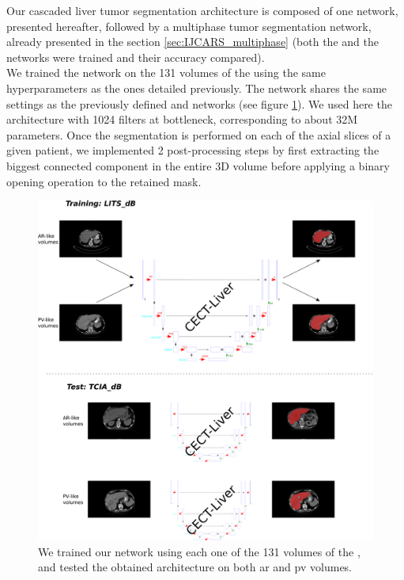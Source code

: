 Our cascaded liver tumor segmentation architecture is composed of one  network, presented hereafter, followed by a multiphase tumor segmentation network, already presented in the section \ref{sec:IJCARS_multiphase} (both the  and the  networks were trained and their accuracy compared). \\
We trained the  network on the 131 volumes of the
\textbf{} using the same hyperparameters as the ones detailed
previously. The network shares the same settings as the previously defined  and  networks (see figure \ref{fig:CECTliverDetails}). We used here the architecture with 1024 filters at bottleneck, corresponding to about 32M parameters. Once the segmentation is performed on each of the axial slices of a given patient, we implemented 2 post-processing steps by first extracting the biggest connected component in the entire 3D volume before applying a binary opening operation to the retained mask.
\begin{figure}[!ht]
	\centering
	\includegraphics[width=\linewidth]{../Contributions/images/CECT_liver_details}
	\caption{We trained our network using each one of the 131 volumes of the \textbf{}, and tested the obtained architecture on both \ac{ar} and \ac{pv} \textbf{} volumes. 
	}
	\label{fig:CECTliverDetails}
\end{figure}

